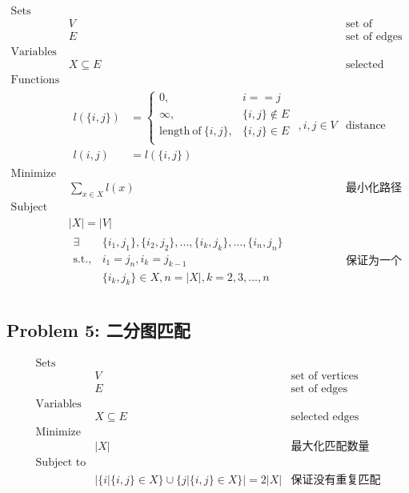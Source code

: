 \documentclass[11pt]{article}
\begin{document}
\begin{eqnarray*}
    \textrm{Sets} \\
        & V & \textrm{set of vertices} \\
        & E & \textrm{set of edges} \\
    \textrm{Variables} \\
        & X \subseteq E & \textrm{selected edges} \\
    \textrm{Functions} \\
        & \begin{array}{rl}
            l(\{i, j\}) &= \left\{
                \begin{array}{ll}
                    0,                              & i == j \\
                    \infty,                         & \{i, j\} \notin E \\
                    \mathrm{length\ of\ }\{i, j\},  & \{i, j\} \in E \\
                \end{array}
            \right. \\
            l(i, j) &= l(\{i, j\})
        \end{array}, i, j \in V & \textrm{distance between vertices} \\
    \textrm{Minimize} \\
        & \displaystyle \sum_{x \in X} l(x) & \textrm{最小化路径长度} \\
    \textrm{Subject to} \\
        & |X| = |V| \\
        & \begin{array}{rl}
            \exists & \{i_1, j_1\}, \{i_2, j_2\}, ..., \{i_k, j_k\}, ..., \{i_n, j_n\} \\
            \mathrm{s.t.,} & i_1 = j_n, i_k = j_{k-1} \\
                    & \{i_k, j_k\} \in X, n = |X|, k = 2, 3, ..., n
        \end{array} & \textrm{保证为一个环} \\ 
\end{eqnarray*}


\newpage
\subsection*{Problem 5: 二分图匹配}

\begin{eqnarray*}
    \textrm{Sets} \\
        & V & \textrm{set of vertices} \\
        & E & \textrm{set of edges} \\
    \textrm{Variables} \\
        & X \subseteq E & \textrm{selected edges} \\
    \textrm{Minimize} \\
        & \displaystyle |X| & \textrm{最大化匹配数量} \\
    \textrm{Subject to} \\
        & |\{i | \{i, j\} \in X\} \cup \{j | \{i, j\} \in X\}| = 2 |X| & \textrm{保证没有重复匹配} \\ 
\end{eqnarray*}
\end{document}
